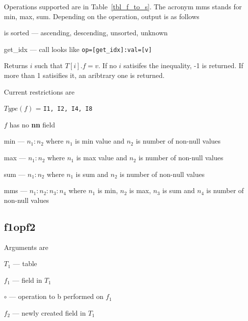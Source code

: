 \documentclass{report}
\begin{document}
Operations supported are in Table~\ref{tbl_f_to_s}. The acronym mms
stands for min, max, sum.
Depending on the operation, output is as follows
\be
\item is sorted --- ascending, descending, unsorted, unknown
\item get\_idx --- call looks like \verb+op=[get_idx]:val=[v]+ 

Returns \(i\) such that \(T[i].f = v\). If no \(i\) satisifes the
inequality, -1 is returned. If more than 1 satisifies it, an aribtrary
one is returned.

Current restrictions are
\be
\item \(Type(f)\) = {\tt I1, I2, I4, I8}
\item \(f\) has no {\bf nn} field 
\ee

\item min --- \(n_1:n_2\) where \(n_1\) is min value and \(n_2\) is
number of non-null values
\item max --- \(n_1:n_2\) where \(n_1\) is max value and \(n_2\) is
number of non-null values
\item sum --- \(n_1:n_2\) where \(n_1\) is sum       and \(n_2\) is
number of non-null values
\item mms --- \(n_1:n_2:n_3:n_4\) where \(n_1\) is min, \(n_2\) is max,
  \(n_3\) is sum and \(n_4\) is number of non-null values
\ee


\subsection{f1opf2}
\label{f1opf2}

Arguments are 
\be
\item \(T_1\) --- table
\item \(f_1\) --- field in \(T_1\)
\item \(\circ\)  --- operation to b performed on \(f_1\)
\item \(f_2\) --- newly created field in \(T_1\)
\ee
\end{document}
